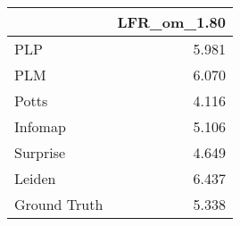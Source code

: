 \begin{tabular}{lr}
\toprule
{} & LFR_om_1.80 \\
\midrule
PLP          &       5.981 \\
PLM          &       6.070 \\
Potts        &       4.116 \\
Infomap      &       5.106 \\
Surprise     &       4.649 \\
Leiden       &       6.437 \\
Ground Truth &       5.338 \\
\bottomrule
\end{tabular}
